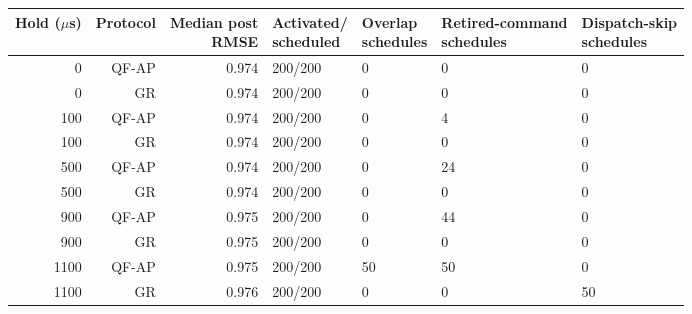 \begin{tabular}{@{}rrrllll@{}}
\toprule
\shortstack{Hold\\($\mu$s)} & Protocol & \shortstack{Median post\\RMSE} & \shortstack{Activated/\\scheduled} & \shortstack{Overlap\\schedules} & \shortstack{Retired-command\\schedules} & \shortstack{Dispatch-skip\\schedules} \\
\midrule
0 & QF-AP & 0.974 & 200/200 & 0 & 0 & 0 \\
0 & GR & 0.974 & 200/200 & 0 & 0 & 0 \\
100 & QF-AP & 0.974 & 200/200 & 0 & 4 & 0 \\
100 & GR & 0.974 & 200/200 & 0 & 0 & 0 \\
500 & QF-AP & 0.974 & 200/200 & 0 & 24 & 0 \\
500 & GR & 0.974 & 200/200 & 0 & 0 & 0 \\
900 & QF-AP & 0.975 & 200/200 & 0 & 44 & 0 \\
900 & GR & 0.975 & 200/200 & 0 & 0 & 0 \\
1100 & QF-AP & 0.975 & 200/200 & 50 & 50 & 0 \\
1100 & GR & 0.976 & 200/200 & 0 & 0 & 50 \\
\bottomrule
\end{tabular}
